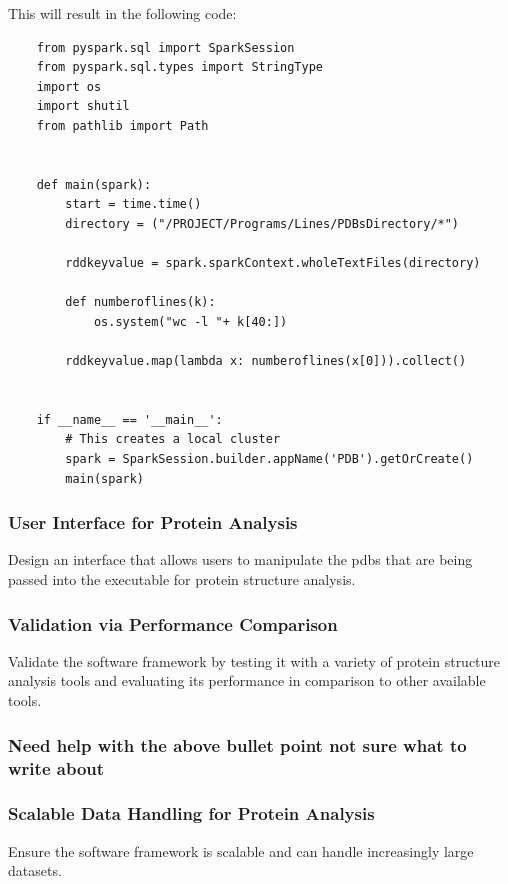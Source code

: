 \documentclass[]{final_report}
\begin{document}
This will result in the following code:

\begin{lstlisting}
    from pyspark.sql import SparkSession
    from pyspark.sql.types import StringType
    import os
    import shutil
    from pathlib import Path


    def main(spark):
        start = time.time()
        directory = ("/PROJECT/Programs/Lines/PDBsDirectory/*")

        rddkeyvalue = spark.sparkContext.wholeTextFiles(directory)

        def numberoflines(k):
            os.system("wc -l "+ k[40:])
        
        rddkeyvalue.map(lambda x: numberoflines(x[0])).collect()


    if __name__ == '__main__':
        # This creates a local cluster
        spark = SparkSession.builder.appName('PDB').getOrCreate()
        main(spark)
\end{lstlisting}

\clearpage

\subsubsection{User Interface for Protein Analysis}
\begin{displayquote}
    Design an interface that allows users to manipulate the pdbs that are being passed into
    the executable for protein structure analysis.
\end{displayquote}

\clearpage

\subsubsection{Validation via Performance Comparison}
\begin{displayquote}
    Validate the software framework by testing it with a variety of protein structure analysis tools and evaluating its performance in comparison to other available tools.
\end{displayquote}

\subsubsection{Need help with the above bullet point not sure what to write about}

\clearpage

\subsubsection{Scalable Data Handling for Protein Analysis}
\begin{displayquote}
    Ensure the software framework is scalable and can handle increasingly large datasets.
\end{displayquote}
\end{document}
